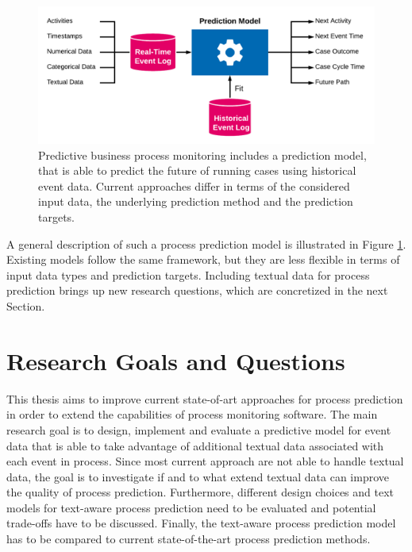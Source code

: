 \begin{figure}[htbp!]
	\centering
	\includegraphics[width=\textwidth]{figures/problem-description}
	\caption[General process prediction model]{Predictive business process monitoring includes a prediction model, that is able to predict the future of running cases using historical event data. Current approaches differ in terms of the considered input data, the underlying prediction method and the prediction targets.}
	\label{fig:/problem-description}
\end{figure}

A general description of such a process prediction model is illustrated in Figure \ref{fig:/problem-description}.
Existing models follow the same framework, but they are less flexible in terms of input data types and prediction targets.
Including textual data for process prediction brings up new research questions, which are concretized in the next Section.

\section{Research Goals and Questions}

This thesis aims to improve current state-of-art approaches for process prediction in order to extend the capabilities of process monitoring software.
The main research goal is to design, implement and evaluate a predictive model for event data that is able to take advantage of additional textual data associated with each event in process.
Since most current approach are not able to handle textual data, the goal is to investigate if and to what extend textual data can improve the quality of process prediction.
Furthermore, different design choices and text models for text-aware process prediction need to be evaluated and potential trade-offs have to be discussed.
Finally, the text-aware process prediction model has to be compared to current state-of-the-art process prediction methods.

